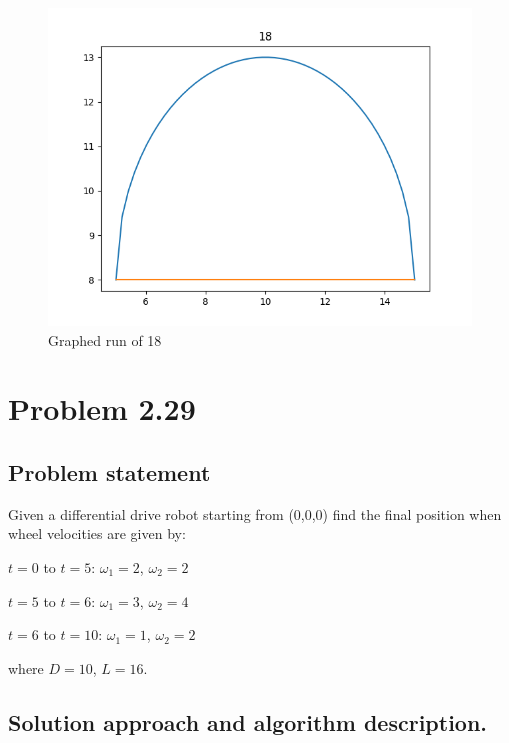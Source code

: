 \documentclass[letterpaper,11pt]{texMemo} %
\begin{document}
\begin{figure}[ht]
\caption{Graphed run of 18}
\centering
\includegraphics[scale=0.7]{img/18.png}
\end{figure}

\newpage
\section*{Problem 2.29}
\subsection*{Problem statement}
Given a differential drive robot starting from (0,0,0) find the final position when wheel
velocities are given by:

$t=0$ to $t=5$: $\omega_1=2$, $\omega_2=2$

$t=5$ to $t=6$: $\omega_1=3$, $\omega_2=4$

$t=6$ to $t=10$: $\omega_1=1$, $\omega_2=2$

where $D=10$, $L=16$.

\subsection*{Solution approach and algorithm description.}
\end{document}
